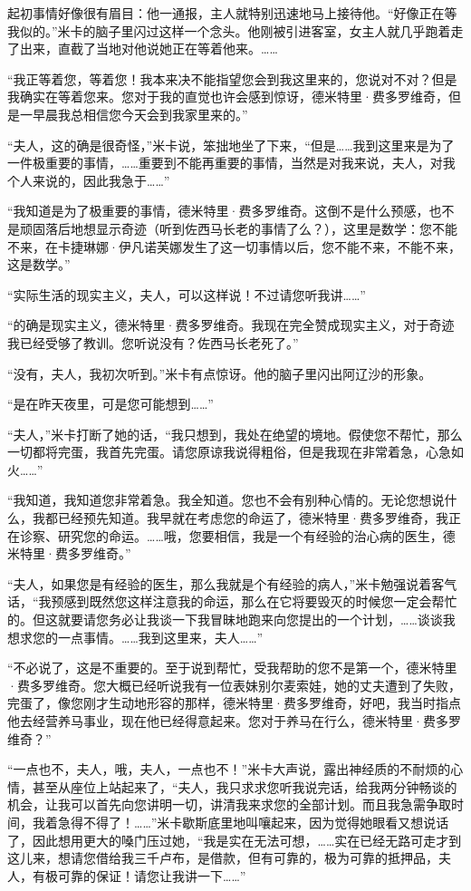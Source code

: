 \par 起初事情好像很有眉目：他一通报，主人就特别迅速地马上接待他。“好像正在等我似的。”米卡的脑子里闪过这样一个念头。他刚被引进客室，女主人就几乎跑着走了出来，直截了当地对他说她正在等着他来。……
\par “我正等着您，等着您！我本来决不能指望您会到我这里来的，您说对不对？但是我确实在等着您来。您对于我的直觉也许会感到惊讶，德米特里·费多罗维奇，但是一早晨我总相信您今天会到我家里来的。”
\par “夫人，这的确是很奇怪，”米卡说，笨拙地坐了下来，“但是……我到这里来是为了一件极重要的事情，……重要到不能再重要的事情，当然是对我来说，夫人，对我个人来说的，因此我急于……”
\par “我知道是为了极重要的事情，德米特里·费多罗维奇。这倒不是什么预感，也不是顽固落后地想显示奇迹（听到佐西马长老的事情了么？），这里是数学：您不能不来，在卡捷琳娜·伊凡诺芙娜发生了这一切事情以后，您不能不来，不能不来，这是数学。”
\par “实际生活的现实主义，夫人，可以这样说！不过请您听我讲……”
\par “的确是现实主义，德米特里·费多罗维奇。我现在完全赞成现实主义，对于奇迹我已经受够了教训。您听说没有？佐西马长老死了。”
\par “没有，夫人，我初次听到。”米卡有点惊讶。他的脑子里闪出阿辽沙的形象。
\par “是在昨天夜里，可是您可能想到……”
\par “夫人，”米卡打断了她的话，“我只想到，我处在绝望的境地。假使您不帮忙，那么一切都将完蛋，我首先完蛋。请您原谅我说得粗俗，但是我现在非常着急，心急如火……”
\par “我知道，我知道您非常着急。我全知道。您也不会有别种心情的。无论您想说什么，我都已经预先知道。我早就在考虑您的命运了，德米特里·费多罗维奇，我正在诊察、研究您的命运。……哦，您要相信，我是一个有经验的治心病的医生，德米特里·费多罗维奇。”
\par “夫人，如果您是有经验的医生，那么我就是个有经验的病人，”米卡勉强说着客气话，“我预感到既然您这样注意我的命运，那么在它将要毁灭的时候您一定会帮忙的。但这就要请您务必让我谈一下我冒昧地跑来向您提出的一个计划，……谈谈我想求您的一点事情。……我到这里来，夫人……”
\par “不必说了，这是不重要的。至于说到帮忙，受我帮助的您不是第一个，德米特里·费多罗维奇。您大概已经听说我有一位表妹别尔麦索娃，她的丈夫遭到了失败，完蛋了，像您刚才生动地形容的那样，德米特里·费多罗维奇，好吧，我当时指点他去经营养马事业，现在他已经得意起来。您对于养马在行么，德米特里·费多罗维奇？”
\par “一点也不，夫人，哦，夫人，一点也不！”米卡大声说，露出神经质的不耐烦的心情，甚至从座位上站起来了，“夫人，我只求求您听我说完话，给我两分钟畅谈的机会，让我可以首先向您讲明一切，讲清我来求您的全部计划。而且我急需争取时间，我着急得不得了！……”米卡歇斯底里地叫嚷起来，因为觉得她眼看又想说话了，因此想用更大的嗓门压过她，“我是实在无法可想，……实在已经无路可走才到这儿来，想请您借给我三千卢布，是借款，但有可靠的，极为可靠的抵押品，夫人，有极可靠的保证！请您让我讲一下……”
